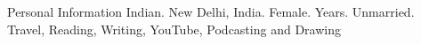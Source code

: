 \begin{rubric}{Personal Information}
\entry*[Nationality]
	Indian.
	New Delhi, India.
\entry*[Gender]
	Female.
 Years.	
	Unmarried.	
\entry*[Hobbies]
	Travel, Reading, Writing, YouTube, Podcasting and Drawing	

\end{rubric}
